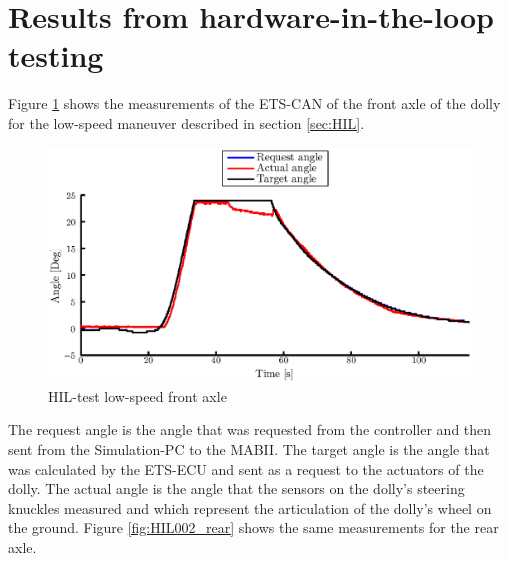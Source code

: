 \documentclass[ExampleMasters.tex]{subfiles}
\begin{document}






\section{Results from hardware-in-the-loop testing}

Figure \ref{fig:HIL002_front} shows the measurements of the ETS-CAN of the front axle of the dolly for the low-speed maneuver described in section \ref{sec:HIL}.\\

\begin{figure}[!htb]
	\centering
	\includegraphics[width=1\linewidth]{figures/HIL002_front}
	\caption{\acrlong{HIL}-test low-speed front axle}
	
	\label{fig:HIL002_front}
\end{figure}

The request angle is the angle that was requested from the controller and then sent from the Simulation-PC to the \gls{MABII}. The target angle is the angle that was calculated by the \gls{ETS}-\gls{ECU} and sent as a request to the actuators of the dolly. The actual angle is the angle that the sensors on the dolly's steering knuckles measured and which represent the articulation of the dolly's wheel on the ground.
Figure \ref{fig:HIL002_rear} shows the same measurements for the rear axle.
\end{document}
